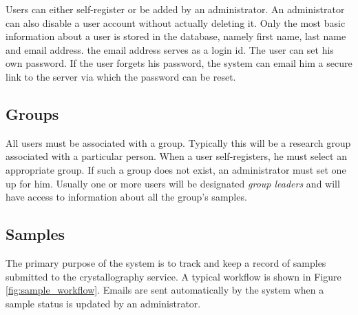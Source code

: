 \documentclass[12pt,twoside]{article}
\begin{document}
Users can either self-register or be added by an administrator.
An administrator can also disable a user account without actually
deleting it.
Only the most basic information about a user is stored in the database,
namely first name, last name and email address. the email address serves
as a login id. The user can set his own password. If the user forgets his
password, the system can email him a secure link to the server via which
the password can be reset.

\subsection{Groups}

All users must be associated with a group. Typically this will be a
research group associated with a particular person. When a user self-registers,
he must select an appropriate group. If such a group does not exist, an
administrator must set one up for him. Usually one or more users will be
designated \emph{group leaders} and will have access to information
about all the group's samples.

\subsection{Samples}

The primary purpose of the system is to track and keep a record of
samples submitted to the crystallography service. A typical workflow is
shown in Figure \ref{fig:sample_workflow}.
Emails are sent automatically by the system when a sample status
is updated by an administrator.
\end{document}
